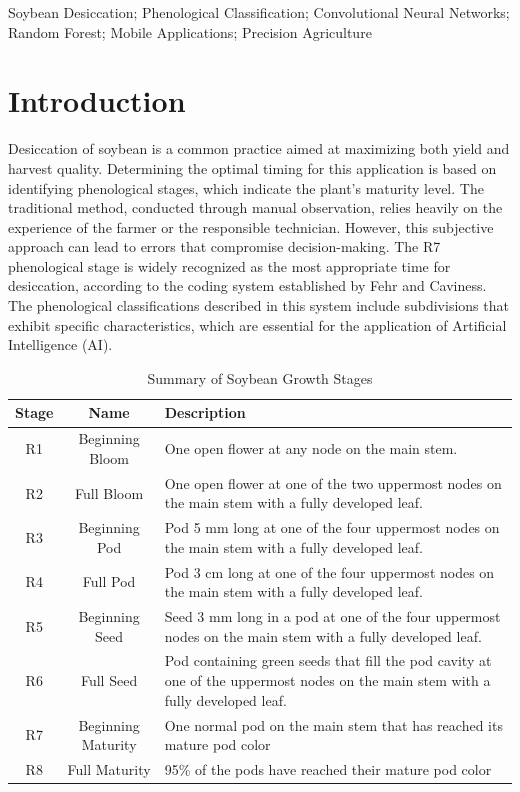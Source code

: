 \documentclass[10pt,conference]{IEEEtran}
\begin{document}
\renewcommand{\IEEEkeywordsname}{Keywords}
\begin{IEEEkeywords}
Soybean Desiccation; Phenological Classification; Convolutional Neural Networks; Random Forest; Mobile Applications; Precision Agriculture
\end{IEEEkeywords}
\IEEEpeerreviewmaketitle
\section{Introduction} 
Desiccation of soybean is a common practice aimed at maximizing both yield and harvest quality. Determining the optimal timing for this application is based on identifying phenological stages, which indicate the plant's maturity level. The traditional method, conducted through manual observation, relies heavily on the experience of the farmer or the responsible technician. However, this subjective approach can lead to errors that compromise decision-making. The R7 phenological stage is widely recognized as the most appropriate time for desiccation, according to the coding system established by Fehr and Caviness. The phenological classifications described in this system include subdivisions that exhibit specific characteristics, which are essential for the application of Artificial Intelligence (AI). 
\begin{table}[!h]
\renewcommand{\arraystretch}{1.3}
\caption{Summary of Soybean Growth Stages}
\label{table:soybean_stages}
\centering
\begin{tabular}{|c|c|p{5.5cm}|}
\hline
\textbf{Stage} & \textbf{Name} & \textbf{Description} \\
\hline
R1 & Beginning Bloom & One open flower at any node on the main stem. \\
\hline
R2 & Full Bloom & One open flower at one of the two uppermost nodes on the main stem with a fully developed leaf. \\
\hline
R3 & Beginning Pod & Pod 5 mm long at one of the four uppermost nodes on the main stem with a fully developed leaf. \\
\hline
R4 & Full Pod & Pod 3 cm long at one of the four uppermost nodes on the main stem with a fully developed leaf. \\
\hline
R5 & Beginning Seed & Seed 3 mm long in a pod at one of the four uppermost nodes on the main stem with a fully developed leaf. \\
\hline
R6 & Full Seed & Pod containing green seeds that fill the pod cavity at one of the uppermost nodes on the main stem with a fully developed leaf. \\
\hline
R7 & Beginning Maturity & One normal pod on the main stem that has reached its mature pod color \\
\hline
R8 & Full Maturity  & 95\% of the pods have reached their mature pod color \\
\hline
\end{tabular}
\end{table}
\end{document}
